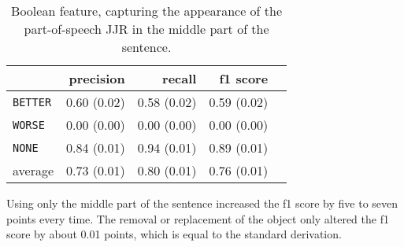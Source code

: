 \begin{table}[h] 
 \centering 
 \caption{Boolean feature, capturing the appearance of the part-of-speech JJR in the middle part of the sentence.} 
 \label{tbl:3jjr}
\begin{tabular}{@{}lrrrr@{}}
\toprule
 	&	 precision &	 recall &	 f1 score  \\ \midrule 
\texttt{BETTER}	&	 0.60 \scriptsize{(0.02)} &	 0.58 \scriptsize{(0.02)} &	 0.59 \scriptsize{(0.02)}  \\ 
\texttt{WORSE}	&	 0.00 \scriptsize{(0.00)} &	 0.00 \scriptsize{(0.00)} &	 0.00 \scriptsize{(0.00)}  \\ 
\texttt{NONE}	&	 0.84 \scriptsize{(0.01)} &	 0.94 \scriptsize{(0.01)} &	 0.89 \scriptsize{(0.01)}  \\ 
average	&	 0.73 \scriptsize{(0.01)} &	 0.80 \scriptsize{(0.01)} &	 0.76 \scriptsize{(0.01)}  \\ 
\bottomrule
\end{tabular}
\end{table}


Using only the middle part of the sentence increased the f1 score by five to seven points every time. The removal or replacement of the object only altered the f1 score by about 0.01 points, which is equal to the standard derivation.\newline \newline





